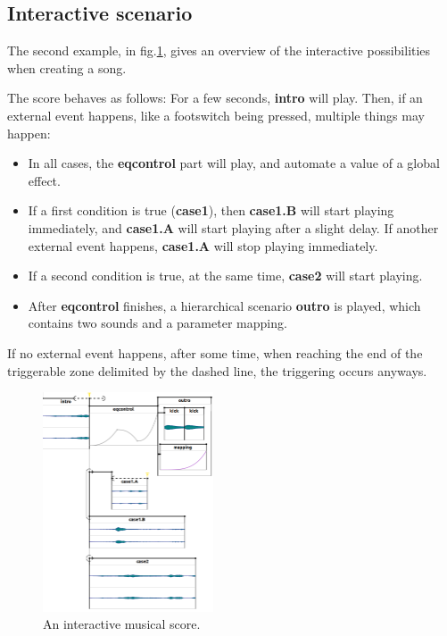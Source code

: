\documentclass{article}
\begin{document}
\subsection{Interactive scenario}
The second example, in fig.\ref{fig.score2}, gives an overview of the interactive possibilities when creating a song.

The score behaves as follows: 
For a few seconds, \textbf{intro} will play.  
Then, if an external event happens, like a footswitch being pressed, 
multiple things may happen: 
\begin{itemize}
    \item In all cases, the \textbf{eqcontrol} part will play, and automate a value of a global effect.
    \item If a first condition is true (\textbf{case1}), then \textbf{case1.B} will start playing immediately, and \textbf{case1.A} will start playing after a slight delay. If another external event happens, \textbf{case1.A} will stop playing immediately.
    \item If a second condition is true, at the same time, \textbf{case2} will start playing.
    \item After \textbf{eqcontrol} finishes, a hierarchical scenario \textbf{outro} is played, which contains two sounds and a parameter mapping.
\end{itemize}
If no external event happens, after some time, when reaching the end of the triggerable zone delimited by the dashed line, the triggering occurs anyways.

\begin{figure}[h]
    \centering
    \includegraphics[width=0.45\textwidth]{figures/ex2.png}
    \caption{An interactive musical score.}
    \label{fig.score2}
\end{figure}
\end{document}
